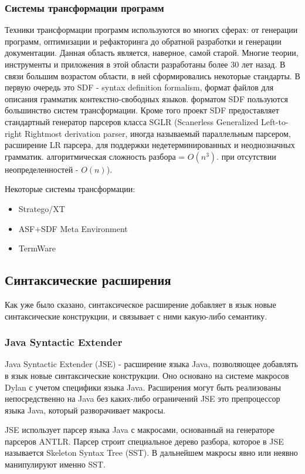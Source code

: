 \documentclass[a4paper,12pt]{article}
\begin{document}
\subsubsection{Системы трансформации программ}
Техники трансформации программ используются во многих сферах: от генерации
программ, оптимизации и рефакторинга до обратной разработки и генерации
документации.
Данная область является, наверное, самой старой. Многие теории, инструменты и
приложения в этой области разработаны более 30 лет назад.
В связи большим возрастом области, в ней сформировались некоторые стандарты.
В первую очередь это SDF - syntax definition formalism, формат файлов для
описания грамматик контекстно-свободных языков. форматом SDF пользуются
большинство систем трансформации.
Кроме того проект SDF предоставляет стандартный генератор парсеров класса SGLR
(Scanerless Generalized Left-to-right Rightmost derivation parser, иногда
называемый параллельным парсером, расширение LR парсера, для поддержки
недетерминированных и неоднозначных грамматик. алгоритмическая сложность разбора
= $O(n^3)$. при отсутствии неопределенностей - $O(n)$).

Некоторые системы трансформации:
\begin{itemize}
  \item Stratego/XT
  \item ASF+SDF Meta Environment
  \item TermWare
\end{itemize}

\subsection{Синтаксические расширения}
Как уже было сказано, синтаксическое расширение добавляет в язык новые
синтаксические конструкции, и связывает с ними какую-либо семантику.

\subsubsection{Java Syntactic Extender}
Java Syntactic Extender (JSE) - расширение языка Java, позволяющее добавлять в
язык новые синтаксические конструкции. Оно основано на системе макросов Dylan с
учетом специфики языка Java. Расширения могут быть реализованы
непосредственно на Java без каких-либо ограничений JSE это
препроцессор языка Java, который разворачивает макросы.

JSE использует парсер языка Java с макросами, основанный на генераторе парсеров
ANTLR. Парсер строит специальное дерево разбора, которое в JSE называется
Skeleton Syntax Tree (SST). В дальнейшем макросы явно или неявно манипулируют
именно SST.
\end{document}
